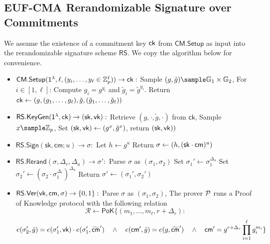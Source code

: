 \subsection{EUF-CMA Rerandomizable Signature over Commitments}\label{sig-construction}
We assume the existence of a commitment key $\mathsf{ck}$ from $\mathsf{CM.Setup}$ as input into the rerandomizable signature scheme $\mathsf{RS}$. We copy the algorithm below for convenience.
\begin{itemize}
    \item $\mathsf{CM.Setup}(\mathsf{1^{\lambda}}, \ell, (y_i, \ldots, y_{\ell} \in \mathbb{Z}_p^{\ell})) \to \mathsf{ck}:$  
    Sample $(g, \tilde{g}) \sample \G_1 \times \G_2$, For $i \in [1,\ell]$: Compute $g_i = g^{y_i}$ and $\tilde{g}_i = \tilde{g}^{y_i}$. Return $\mathsf{ck} \gets (g, (g_1,\ldots,g_\ell), \tilde{g}, (\tilde{g}_1,\ldots,\tilde{g}_\ell))$
    
    \item $\mathsf{RS.KeyGen}(\mathsf{1^{\lambda}}, \mathsf{ck}) \to (\mathsf{sk}, \mathsf{vk}):$ 
        Retrieve $(g, \cdot, \tilde{g}, \cdot)$ from $\mathsf{ck}$,
        Sample $x \sample \Z_p$,
        Set $(\mathsf{sk}, \mathsf{vk}) \gets (g^x, \tilde{g}^x)$, return $(\mathsf{sk}, \mathsf{vk}))$
    
    \item $\mathsf{RS.Sign}(\mathsf{sk}, \mathsf{cm}; u) \to \sigma:$ 
        Let $h \gets g^u$
        Return $\sigma \gets (h, (\mathsf{sk} \cdot \mathsf{cm})^u)$
    
    \item $\mathsf{RS.Rerand}(\sigma, \Delta_r, \Delta_u) \to \sigma':$
        Parse $\sigma$ as $(\sigma_1, \sigma_2)$
        Set $\sigma_1' \gets \sigma_1^{\Delta_u}$
        Set $\sigma_2' \gets (\sigma_2 \cdot \sigma_1^{\Delta_r})^{\Delta_u}$
        Return $\sigma' \gets (\sigma_1', \sigma_2')$
    
    \item $\mathsf{RS.Ver}(\mathsf{vk}, \mathsf{cm}, \sigma) \to \{0,1\}:$
        Parse $\sigma$ as $(\sigma_1, \sigma_2)$, The prover $\mathcal{P}$ runs a Proof of Knowledge protocol with the following relation 
    \[
        \mathcal{R} \gets \mathsf{PoK}\{(m_1,\ldots,m_\ell, r + \Delta_r): 
    \]
    \[
         e(\sigma_2', \tilde{g}) = e(\sigma_1', \mathsf{vk})\cdot e(\sigma_1', \widetilde{\mathsf{cm}}') \quad \wedge \quad
        e(\mathsf{cm}', \tilde{g}) = e(g, \widetilde{\mathsf{cm}}') \quad \wedge \quad
        \mathsf{cm}' = g^{r + \Delta_r} \prod_{i=1}^\ell g_i^{m_i}
        \}
    \]
        
\end{itemize}






